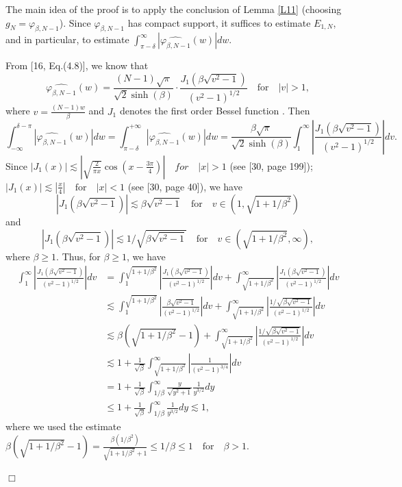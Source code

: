 \documentclass[a4paper]{article}
\newenvironment{proof}{\noindent{\em Proof:}}{\quad \hfill$\Box$\vspace{2ex}}
\numberwithin{equation}{section}
\begin{document}
\begin{proof}
The main idea of the proof is to apply the conclusion of Lemma \ref{L11} (choosing $g_{N}=\varphi_{\beta,N-1}$). Since $\varphi_{\beta,N-1}$ has compact support, it suffices to estimate $E_{1,N}$, and in particular, to estimate $\int_{\pi-\delta}^{\infty}|\widehat{\varphi_{\beta,N-1}}(w)|dw$.





From [16, Eq.(4.8)], we know that
\begin{equation} 
\widehat{\varphi_{\beta,N-1}}(w)=
\frac{(N-1)\sqrt{\pi}}{\sqrt{2}\sinh(\beta)}\cdot \frac{J_{1}(\beta\sqrt{v^2-1})}{(v^2-1)^{1/2}}\quad \text{for}\quad |v|>1 ,\end{equation} 
where $v=\frac{(N-1)w}{\beta}$ and $J_1$ denotes the first order Bessel function \cite{watson1922treatise}. Then 
$$\int_{-\infty}^{\delta-\pi}|\widehat{\varphi_{\beta,N-1}}(w)|dw=\int_{\pi-\delta}^{+\infty}|\widehat{\varphi_{\beta,N-1}}(w)|dw=\frac{\beta\sqrt{\pi}}{\sqrt{2}\sinh(\beta)}\int_{1}^{\infty} \left|\frac{J_{1}(\beta\sqrt{v^2-1})}{(v^2-1)^{1/2}}\right|dv.$$
Since $|J_{1}(x)|\lesssim\left|\sqrt{\frac{2}{\pi x}}\cos(x-\frac{3\pi}{4})\right| \quad for \quad |x|>1$ (see [30, page 199]); $|J_{1}(x)|\lesssim|\frac{x}{4}|\quad \text{for} \quad |x|< 1$ (see [30, page 40]), we have $$|J_{1}(\beta\sqrt{v^2-1})|\lesssim \beta\sqrt{v^2-1}\quad \text{for}\quad  v\in(1,\sqrt{1+1/\beta^2})$$ and $$|J_{1}(\beta\sqrt{v^2-1})|\lesssim 1/\sqrt{\beta\sqrt{v^2-1}}\quad \text{for}\quad  v\in(\sqrt{1+1/\beta^2},\infty),$$  where $\beta\ge 1$. Thus, for $\beta\ge 1$, we have 
\begin{equation*}\begin{split}
\int_{1}^{\infty} \left|\frac{J_{1}(\beta\sqrt{v^2-1})}{(v^2-1)^{1/2}}\right|dv&=  \int_{1}^{\sqrt{1+1/\beta^2}} \left|\frac{J_{1}(\beta\sqrt{v^2-1})}{(v^2-1)^{1/2}}\right|dv+\int_{\sqrt{1+1/\beta^2}}^{\infty} \left|\frac{J_{1}(\beta\sqrt{v^2-1})}{(v^2-1)^{1/2}}\right|dv\\ &\lesssim \int_{1}^{\sqrt{1+1/\beta^2}} \left|\frac{\beta\sqrt{v^2-1}}{(v^2-1)^{1/2}}\right|dv+\int_{\sqrt{1+1/\beta^2}}^{\infty} \left|\frac{1/\sqrt{\beta\sqrt{v^2-1}}}{(v^2-1)^{1/2}}\right|dv\\&\lesssim \beta(\sqrt{1+1/\beta^2}-1)+\int_{\sqrt{1+1/\beta^2}}^{\infty} \left|\frac{1/\sqrt{\beta\sqrt{v^2-1}}}{(v^2-1)^{1/2}}\right|dv
\\&\lesssim  1+\frac{1}{\sqrt{\beta}}\int_{\sqrt{1+1/\beta^2}}^{\infty} \left|\frac{1}{(v^2-1)^{3/4}}\right|dv\\& =1+\frac{1}{\sqrt{\beta}}\int_{1/\beta}^{\infty}\frac{y}{\sqrt{y^{2}+1}}\frac{1}{y^{3/2}}dy\\&\le 1+\frac{1}{\sqrt{\beta}}\int_{1/\beta}^{\infty} \frac{1}{y^{3/2}}dy
\lesssim 1,
\end{split}
\end{equation*}
where we used the estimate $\beta(\sqrt{1+1/\beta^2}-1)= \frac{\beta(1/\beta^2)}{\sqrt{1+1/\beta^2}+1}\le 1/\beta\le 1 \quad \text{for} \quad \beta>1 $.


\end{proof}
\end{document}
